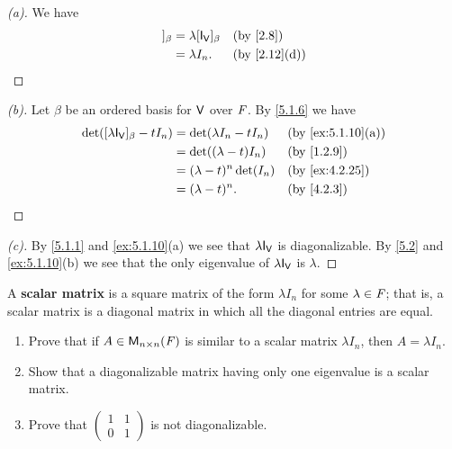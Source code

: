 \begin{proof}[(a)]
  We have
  \begin{align*}
    [\lambda \IT[\V]]_{\beta} & = \lambda [\IT[\V]]_{\beta} &  & \by{2.8}     \\
                              & = \lambda I_n.              &  & \by{2.12}[d]
  \end{align*}
\end{proof}

\begin{proof}[(b)]
  Let \(\beta\) be an ordered basis for \(\mathsf{V}\) over \(\mathit{F}\).
  By \cref{5.1.6} we have
  \begin{align*}
    \det([\lambda \IT[\V]]_{\beta} - t I_n) & = \det(\lambda I_n - t I_n) &  & \by{ex:5.1.10}[a] \\
                                            & = \det((\lambda - t) I_n)   &  & \by{1.2.9}        \\
                                            & = (\lambda - t)^n \det(I_n) &  & \by{ex:4.2.25}    \\
                                            & = (\lambda - t)^n.          &  & \by{4.2.3}
  \end{align*}
\end{proof}

\begin{proof}[(c)]
  By \cref{5.1.1} and \cref{ex:5.1.10}(a) we see that \(\lambda \IT[\V]\) is diagonalizable.
  By \cref{5.2} and \cref{ex:5.1.10}(b) we see that the only eigenvalue of \(\lambda \IT[\V]\) is \(\lambda\).
\end{proof}

\begin{ex}\label{ex:5.1.11}
  A \textbf{scalar matrix} is a square matrix of the form \(\lambda I_n\) for some \(\lambda \in \mathit{F}\);
  that is, a scalar matrix is a diagonal matrix in which all the diagonal entries are equal.
  \begin{enumerate}
    \item Prove that if \(A \in \ms[n][n][\F]\) is similar to a scalar matrix \(\lambda I_n\), then \(A = \lambda I_n\).
    \item Show that a diagonalizable matrix having only one eigenvalue is a scalar matrix.
    \item Prove that \(\begin{pmatrix}
            1 & 1 \\
            0 & 1
          \end{pmatrix}\) is not diagonalizable.
  \end{enumerate}
\end{ex}

